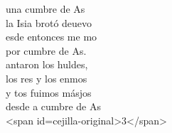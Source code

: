 \begin{cancion}%
	una cumbre de As  \\
	la Isia brotó deuevo\\
	esde entonces me mo\\
	por cumbre de As. \\
	antaron los huldes,\\
	los res y los enmos\\
	y tos fuimos másjos\\
	desde a cumbre de As\\
<span id=cejilla-original>3</span>\\
\end{cancion}%
